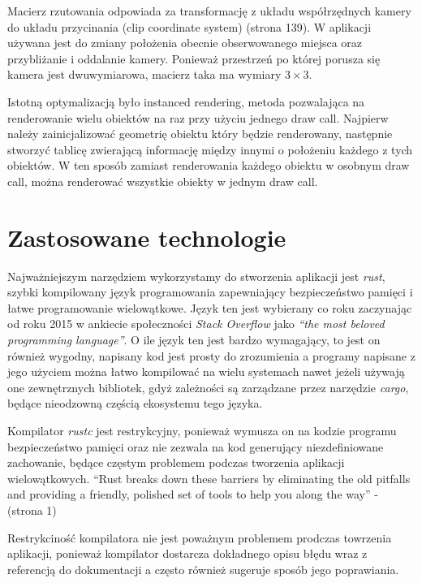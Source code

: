 \documentclass[12pt, letterpaper]{report}
\begin{document}
    Macierz rzutowania odpowiada za transformację z układu współrzędnych kamery do układu przycinania 
    (clip coordinate system) \cite{grafika3d} (strona 139). W aplikacji używana jest do zmiany położenia 
    obecnie obserwowanego miejsca oraz przybliżanie i oddalanie kamery. Ponieważ przestrzeń po której porusza się
    kamera jest dwuwymiarowa, macierz taka ma wymiary $3 \times 3$.

    Istotną optymalizacją było instanced rendering, metoda pozwalająca na renderowanie wielu obiektów na raz 
    przy użyciu jednego draw call. Najpierw należy zainicjalizować geometrię obiektu który będzie renderowany, 
    następnie stworzyć tablicę zwierającą informację między innymi o położeniu każdego z tych obiektów. W ten sposób
    zamiast renderowania każdego obiektu w osobnym draw call, można renderować wszystkie obiekty w jednym draw call.

    \section{Zastosowane technologie}

    Najważniejszym narzędziem wykorzystamy do stworzenia aplikacji jest \emph{rust}, szybki kompilowany 
    język programowania zapewniający bezpieczeństwo pamięci i łatwe programowanie wielowątkowe. 
    Język ten jest wybierany co roku zaczynając od roku 2015 w ankiecie społeczności \emph{Stack Overflow} jako 
    \emph{``the most beloved programming language''}. O ile język ten jest bardzo wymagający, to jest 
    on również wygodny, napisany kod jest prosty do zrozumienia a programy napisane z jego użyciem 
    można łatwo kompilować na wielu systemach nawet jeżeli używają one zewnętrznych bibliotek, gdyż 
    zależności są zarządzane przez narzędzie \emph{cargo}, będące nieodzowną częścią ekosystemu tego języka.

    Kompilator \emph{rustc} jest restrykcyjny, ponieważ wymusza on na kodzie programu bezpieczeństwo pamięci oraz
    nie zezwala na kod generujący niezdefiniowane zachowanie, będące częstym problemem podczas tworzenia aplikacji
    wielowątkowych. ``Rust breaks down these barriers by eliminating the old pitfalls and providing a friendly, 
    polished set of tools to help you along the way'' - \cite{rustbook} (strona 1)

    Restrykciność kompilatora nie jest poważnym problemem prodczas towrzenia aplikacji, ponieważ 
    kompilator dostarcza dokładnego opisu błędu wraz z referencją do dokumentacji a często również 
    sugeruje sposób jego poprawiania. \\
\end{document}
